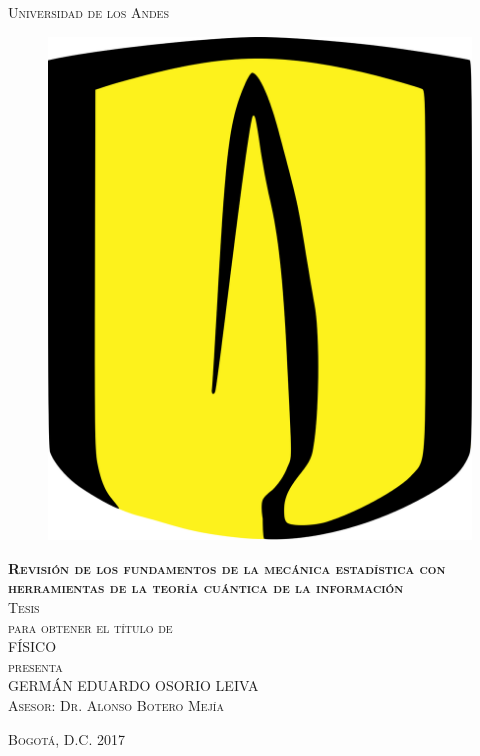 \documentclass[11pt]{book}
\theoremstyle{definition}
\begin{document}
\begin{titlepage}
\begin{center}

\textsc{\Large Universidad de los Andes}\\[4em]

\begin{figure}[h]
\begin{center}
\includegraphics[scale=0.045]{ellogo.png}
\end{center}
\end{figure}

\vspace{4em}

\textsc{\huge \textbf{Revisión de los fundamentos de la mecánica estadística con herramientas de la teoría cuántica de la información}}\\[4em]

\textsc{\large Tesis}\\[1em]

\textsc{para obtener el título de}\\[1em]

\textsc{FÍSICO}\\[1em]

\textsc{presenta}\\[1em]

\textsc{\Large 	GERMÁN EDUARDO OSORIO LEIVA}\\[1em]
		
\textsc{\large Asesor: Dr. Alonso Botero Mejía}

\end{center}

\vspace*{\fill}
\textsc{Bogotá, D.C. \hspace*{\fill} 2017}

\end{titlepage}
\end{document}
